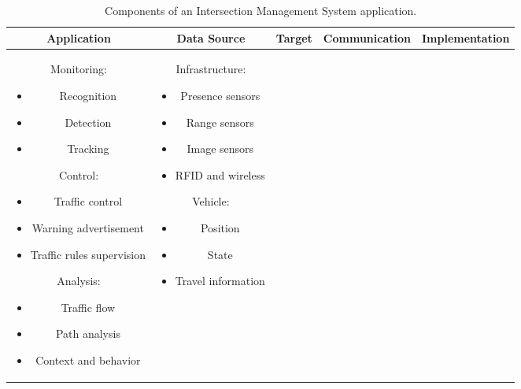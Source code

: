 \begin{table*}[tp]
\footnotesize
\caption{Components of an Intersection Management System application.}
\label{imsComps}
\begin{xtabular*}{\textwidth}{|c|c|c|c|c|}
\hline
\textbf{Application} & \textbf{Data Source} & \textbf{Target} & \textbf{Communication} & \textbf{Implementation}\\
\hline
\parbox{3.8cm}{
Monitoring:
\begin{itemize}
	\item Recognition
	\item 		Detection
	\item 			Tracking
\end{itemize}
Control:
	\begin{itemize}
		\item Traffic control
		\item 			Warning advertisement
		\item 			Traffic rules supervision
	\end{itemize}
	Analysis:
	\begin{itemize}
		\item Traffic flow
		\item 			Path analysis
		\item 			Context and behavior
	\end{itemize}
	}
 & 
 \parbox{3cm}{
 Infrastructure:
 \begin{itemize}
		\item Presence sensors
		\item			Range sensors
		\item			Image sensors 
		\item			RFID and wireless
	\end{itemize}
 	
		Vehicle:
			
		\begin{itemize}
		\item Position
		\item 			State 
		\item 			Travel information	 


\end{itemize}}
\end{xtabular*}
\end{table*}
